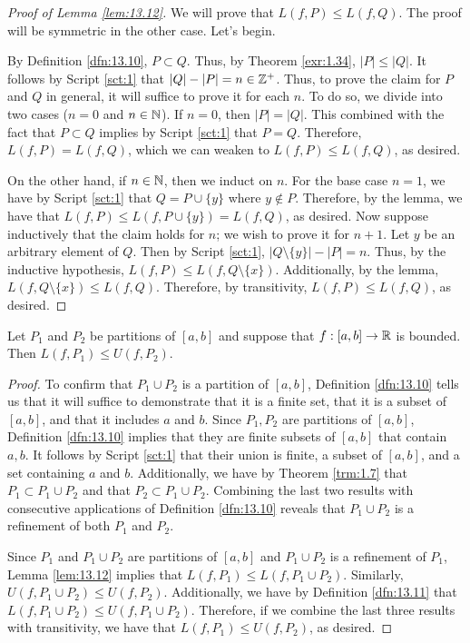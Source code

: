 \documentclass[../main.tex]{subfiles}
\begin{document}
\begin{lemma}
\begin{proof}[Proof of Lemma \ref{lem:13.12}]
        We will prove that $L(f,P)\leq L(f,Q)$. The proof will be symmetric in the other case. Let's begin.\par
        By Definition \ref{dfn:13.10}, $P\subset Q$. Thus, by Theorem \ref{exr:1.34}, $|P|\leq|Q|$. It follows by Script \ref{sct:1} that $|Q|-|P|=n\in\mathbb{Z}^+$. Thus, to prove the claim for $P$ and $Q$ in general, it will suffice to prove it for each $n$. To do so, we divide into two cases ($n=0$ and $n\in\mathbb{N}$). If $n=0$, then $|P|=|Q|$. This combined with the fact that $P\subset Q$ implies by Script \ref{sct:1} that $P=Q$. Therefore, $L(f,P)=L(f,Q)$, which we can weaken to $L(f,P)\leq L(f,Q)$, as desired.\par
        On the other hand, if $n\in\mathbb{N}$, then we induct on $n$. For the base case $n=1$, we have by Script \ref{sct:1} that $Q=P\cup\{y\}$ where $y\notin P$. Therefore, by the lemma, we have that $L(f,P)\leq L(f,P\cup\{y\})=L(f,Q)$, as desired. Now suppose inductively that the claim holds for $n$; we wish to prove it for $n+1$. Let $y$ be an arbitrary element of $Q$. Then by Script \ref{sct:1}, $|Q\setminus\{y\}|-|P|=n$. Thus, by the inductive hypothesis, $L(f,P)\leq L(f,Q\setminus\{x\})$. Additionally, by the lemma, $L(f,Q\setminus\{x\})\leq L(f,Q)$. Therefore, by transitivity, $L(f,P)\leq L(f,Q)$, as desired.
    \end{proof}
\end{lemma}

\begin{theorem}\label{trm:13.13}
    Let $P_1$ and $P_2$ be partitions of $[a,b]$ and suppose that $f:[a,b]\to\mathbb{R}$ is bounded. Then $L(f,P_1)\leq U(f,P_2)$.
    \begin{proof}
        To confirm that $P_1\cup P_2$ is a partition of $[a,b]$, Definition \ref{dfn:13.10} tells us that it will suffice to demonstrate that it is a finite set, that it is a subset of $[a,b]$, and that it includes $a$ and $b$. Since $P_1,P_2$ are partitions of $[a,b]$, Definition \ref{dfn:13.10} implies that they are finite subsets of $[a,b]$ that contain $a,b$. It follows by Script \ref{sct:1} that their union is finite, a subset of $[a,b]$, and a set containing $a$ and $b$. Additionally, we have by Theorem \ref{trm:1.7} that $P_1\subset P_1\cup P_2$ and that $P_2\subset P_1\cup P_2$. Combining the last two results with consecutive applications of Definition \ref{dfn:13.10} reveals that $P_1\cup P_2$ is a refinement of both $P_1$ and $P_2$.\par
        Since $P_1$ and $P_1\cup P_2$ are partitions of $[a,b]$ and $P_1\cup P_2$ is a refinement of $P_1$, Lemma \ref{lem:13.12} implies that $L(f,P_1)\leq L(f,P_1\cup P_2)$. Similarly, $U(f,P_1\cup P_2)\leq U(f,P_2)$. Additionally, we have by Definition \ref{dfn:13.11} that $L(f,P_1\cup P_2)\leq U(f,P_1\cup P_2)$. Therefore, if we combine the last three results with transitivity, we have that $L(f,P_1)\leq U(f,P_2)$, as desired.
    \end{proof}
\end{theorem}
\end{document}
